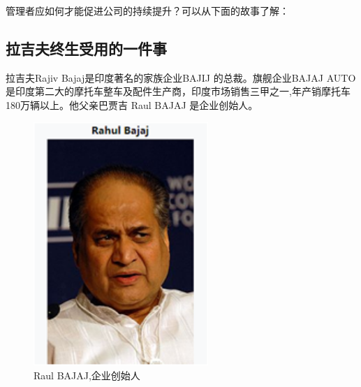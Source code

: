 管理者应如何才能促进公司的持续提升？可以从下面的故事了解：\\


\hypertarget{ux6211ux4eecux5f88ux6ce8ux91cdux8d28ux91cfux4e0eux5ba2ux6237ux6ee1ux610fux5ea6}{%
\subsection{拉吉夫终生受用的一件事}\label{ux6211ux4eecux5f88ux6ce8ux91cdux8d28ux91cfux4e0eux5ba2ux6237ux6ee1ux610fux5ea6}}


拉吉夫Rajiv Bajaj是印度著名的家族企业BAJIJ 的总裁。旗舰企业BAJAJ AUTO
是印度第二大的摩托车整车及配件生产商，印度市场销售三甲之一,年产销摩托车180万辆以上。他父亲巴贾吉
Raul BAJAJ 是企业创始人。

\begin{figure}
\centering
\includegraphics[width=2.60417in,height=\textheight]{Rajia1.png}
\caption{Raul BAJAJ,企业创始人}
\end{figure}


